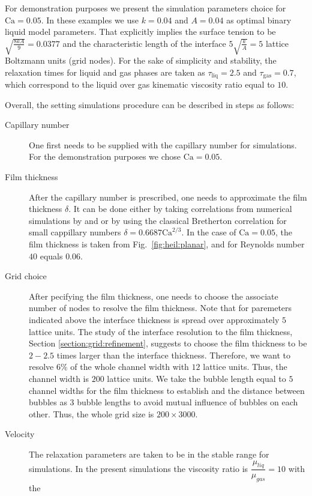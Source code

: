 \documentclass[preprint,12pt]{elsarticle}
\newcommand{\Ca}{\mathrm{Ca}}
\begin{document}
{\color{red}
For demonstration purposes we present the simulation parameters choice for $\Ca=0.05$.
In these
examples we use $k=0.04$ and $A=0.04$ as optimal binary liquid model parameters.
That explicitly implies the surface tension to be $\sqrt{\frac{8 k
A}{9}}=0.0377$ and the characteristic length of the interface
$5\sqrt{\frac{k}{A}}=5$ lattice Boltzmann units (grid nodes). For the sake of simplicity and
stability, the relaxation times for liquid and gas phases are taken as
$\tau_{\mathrm{liq}}=2.5$ and $\tau_{\mathrm{gas}}=0.7$, which correspond
to the liquid over gas kinematic viscosity ratio equal to $10$.

Overall, the setting simulations procedure can be described in steps as follows:
\begin{description}
 \item[Capillary number] One first needs to be supplied with the capillary number for
simulations. For the demonstration purposes we chose $\Ca=0.05$. 
 \item[Film thickness] After the capillary number is prescribed, one needs to approximate the film
thickness $\delta$. It can be done either by taking correlations from numerical simulations by
\citet{heil-bretherton} and \citet{giavedoni-numerical} or by using the classical Bretherton
correlation for small cappillary numbers $\delta=0.6687 \Ca^{2/3}$. In the case of $\Ca=0.05$, the 
film thickness is taken from {\color{green} Fig.~\ref{fig:heil:planar}},
  and for Reynolds number $40$ equals $0.06$.  
\item[Grid choice] After pecifying the film thickness, one needs to choose the associate
number of nodes to resolve the film thickness. Note that for paremeters indicated above the
interface thickness is spread over approximately $5$ lattice units. The study of the interface
resolution to the film thickness, Section \ref{section:grid:refinement}, suggests to choose the
film thickness to be $2-2.5$ times larger than the interface thickness. Therefore, we want to
  resolve $6\%$ of the whole channel width with $12$ lattice units.  Thus, the channel
  width is $200$ lattice units. We take the bubble length equal to $5$ channel widths for the film
thickness to establish
  and the distance between bubbles as $3$ bubble lengths to avoid mutual influence of bubbles on
each other. Thus, the whole grid size is $200 \times 3000$.
 \item[Velocity] The relaxation parameters are taken to be in the stable range for simulations.
In the present simulations the viscosity ratio is $\dfrac{\mu_{liq}}{\mu_{gas}}=10$ with the

\end{description}}
\end{document}
